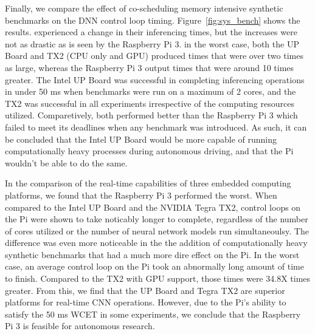 Finally, we compare the effect of co-scheduling memory intensive
synthetic benchmarks on the DNN control loop timing.
Figure~\ref{fig:sys_bench} shows the results. 
experienced a change in their inferencing times, but the increases 
were not as drastic as is seen by the Raspberry Pi 3. in the worst 
case, both the UP Board and TX2 (CPU only and GPU) produced times 
that were over two times as large, whereas the Raspberry Pi 3 output 
times that were around 10 times greater. The Intel UP Board was 
successful in completing inferencing operations in under 50 ms when 
benchmarks were run on a maximum of 2 cores, and the TX2 was 
successful in all experiments irrespective of the computing resources 
utilized. Comparetively, both performed better than the Raspberry Pi 
3 which failed to meet its deadlines when any benchmark was 
introduced. As such, it can be concluded that the Intel UP Board 
would be more capable of running computationally heavy processes 
during autonomous driving, and that the Pi wouldn't be able to do the 
same.

In the comparison of the real-time capabilities of three embedded 
computing platforms, we found that the Raspberry Pi 3 performed the 
worst. When compared to the Intel UP Board and the NVIDIA Tegra TX2, 
control loops on the Pi were shown to take noticably longer to 
complete, regardless of the number of cores utilized or the number of 
neural network models run simultaneoulsy. The difference was even 
more noticeable in the the addition of computationally heavy 
synthetic benchmarks that had a much more dire effect on the Pi. In 
the worst case, an average control loop on the Pi took an abnormally 
long amount of time to finish. Compared to the TX2 with GPU support, 
those times were 34.8X times greater. From this, we find that the UP 
Board and Tegra TX2 are superior platforms for real-time CNN 
operations. However, due to the Pi's ability to satisfy the 50 ms 
WCET in some experiments, we conclude that the Raspberry Pi 3 is 
feasible for autonomous research.



